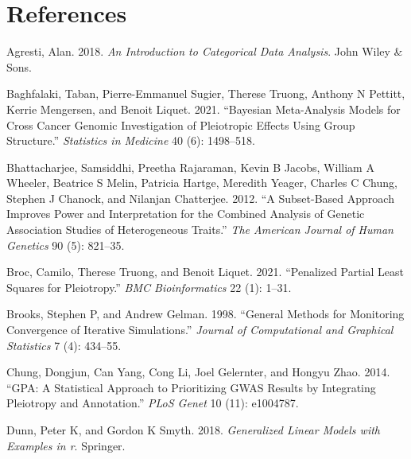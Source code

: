 \hypertarget{references}{%
\section*{References}\label{references}}

\hypertarget{refs}{}
\begin{CSLReferences}{1}{0}
\leavevmode{}%
Agresti, Alan. 2018. \emph{An Introduction to Categorical Data Analysis}. John Wiley \& Sons.

\leavevmode{}%
Baghfalaki, Taban, Pierre-Emmanuel Sugier, Therese Truong, Anthony N Pettitt, Kerrie Mengersen, and Benoit Liquet. 2021. {``Bayesian Meta-Analysis Models for Cross Cancer Genomic Investigation of Pleiotropic Effects Using Group Structure.''} \emph{Statistics in Medicine} 40 (6): 1498--518.

\leavevmode{}%
Bhattacharjee, Samsiddhi, Preetha Rajaraman, Kevin B Jacobs, William A Wheeler, Beatrice S Melin, Patricia Hartge, Meredith Yeager, Charles C Chung, Stephen J Chanock, and Nilanjan Chatterjee. 2012. {``A Subset-Based Approach Improves Power and Interpretation for the Combined Analysis of Genetic Association Studies of Heterogeneous Traits.''} \emph{The American Journal of Human Genetics} 90 (5): 821--35.

\leavevmode{}%
Broc, Camilo, Therese Truong, and Benoit Liquet. 2021. {``Penalized Partial Least Squares for Pleiotropy.''} \emph{BMC Bioinformatics} 22 (1): 1--31.

\leavevmode{}%
Brooks, Stephen P, and Andrew Gelman. 1998. {``General Methods for Monitoring Convergence of Iterative Simulations.''} \emph{Journal of Computational and Graphical Statistics} 7 (4): 434--55.

\leavevmode{}%
Chung, Dongjun, Can Yang, Cong Li, Joel Gelernter, and Hongyu Zhao. 2014. {``GPA: A Statistical Approach to Prioritizing GWAS Results by Integrating Pleiotropy and Annotation.''} \emph{PLoS Genet} 10 (11): e1004787.

\leavevmode{}%
Dunn, Peter K, and Gordon K Smyth. 2018. \emph{Generalized Linear Models with Examples in r}. Springer.


\end{CSLReferences}
